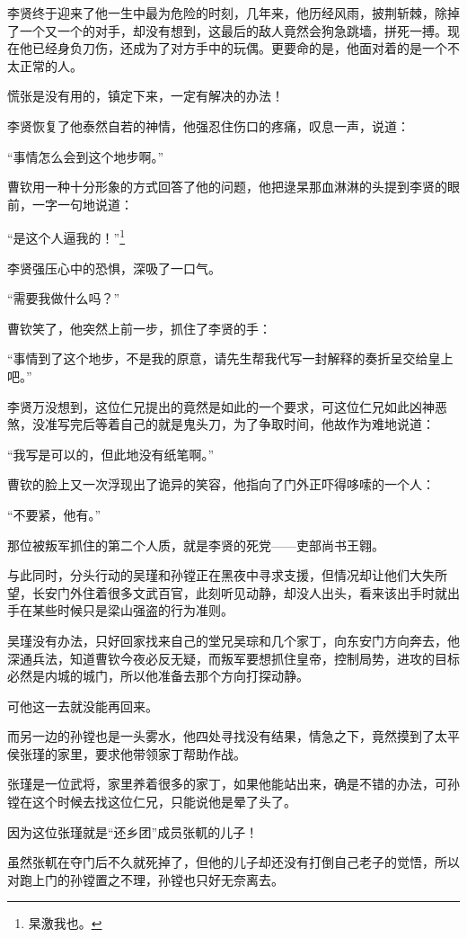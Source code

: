 \begin{multicols}{\theparacolNo}
李贤终于迎来了他一生中最为危险的时刻，几年来，他历经风雨，披荆斩棘，除掉了一个又一个的对手，却没有想到，这最后的敌人竟然会狗急跳墙，拼死一搏。现在他已经身负刀伤，还成为了对方手中的玩偶。更要命的是，他面对着的是一个不太正常的人。

慌张是没有用的，镇定下来，一定有解决的办法！

李贤恢复了他泰然自若的神情，他强忍住伤口的疼痛，叹息一声，说道：

“事情怎么会到这个地步啊。”

曹钦用一种十分形象的方式回答了他的问题，他把逯杲那血淋淋的头提到李贤的眼前，一字一句地说道：

“是这个人逼我的！”\footnote{杲激我也。}

李贤强压心中的恐惧，深吸了一口气。

“需要我做什么吗？”

曹钦笑了，他突然上前一步，抓住了李贤的手：

“事情到了这个地步，不是我的原意，请先生帮我代写一封解释的奏折呈交给皇上吧。”

李贤万没想到，这位仁兄提出的竟然是如此的一个要求，可这位仁兄如此凶神恶煞，没准写完后等着自己的就是鬼头刀，为了争取时间，他故作为难地说道：

“我写是可以的，但此地没有纸笔啊。”

曹钦的脸上又一次浮现出了诡异的笑容，他指向了门外正吓得哆嗦的一个人：

“不要紧，他有。”

那位被叛军抓住的第二个人质，就是李贤的死党——吏部尚书王翱。

与此同时，分头行动的吴瑾和孙镗正在黑夜中寻求支援，但情况却让他们大失所望，长安门外住着很多文武百官，此刻听见动静，却没人出头，看来该出手时就出手在某些时候只是梁山强盗的行为准则。

吴瑾没有办法，只好回家找来自己的堂兄吴琮和几个家丁，向东安门方向奔去，他深通兵法，知道曹钦今夜必反无疑，而叛军要想抓住皇帝，控制局势，进攻的目标必然是内城的城门，所以他准备去那个方向打探动静。

可他这一去就没能再回来。

而另一边的孙镗也是一头雾水，他四处寻找没有结果，情急之下，竟然摸到了太平侯张瑾的家里，要求他带领家丁帮助作战。

张瑾是一位武将，家里养着很多的家丁，如果他能站出来，确是不错的办法，可孙镗在这个时候去找这位仁兄，只能说他是晕了头了。

因为这位张瑾就是“还乡团”成员张軏的儿子！

虽然张軏在夺门后不久就死掉了，但他的儿子却还没有打倒自己老子的觉悟，所以对跑上门的孙镗置之不理，孙镗也只好无奈离去。


\end{multicols}
